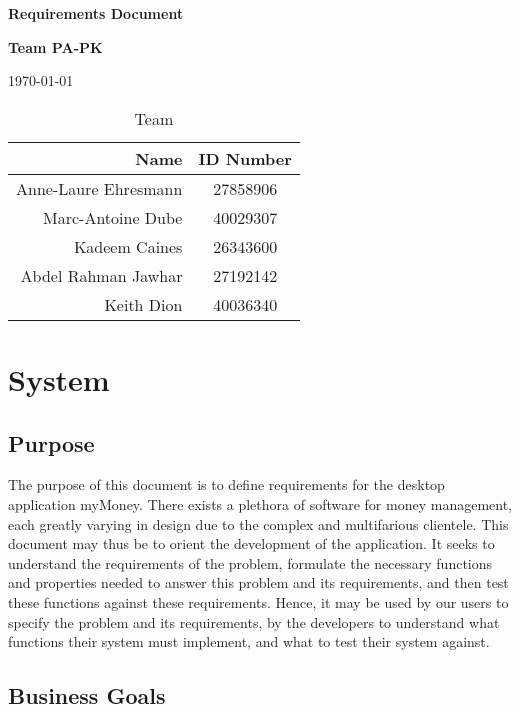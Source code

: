 \documentclass[11pt]{article}
\newcounter{use case ID}
\begin{document}
\vspace*{0.5in}
\centerline{\bf\Large Requirements Document}

\vspace*{0.5in}
\centerline{\bf\Large Team PA-PK}

\vspace*{0.5in}
\centerline{\today}

\vspace*{1.5in}
\begin{table}[htbp]
\caption{Team}
\begin{center}
\begin{tabular}{|r | c|}
\hline
Name & ID Number \\
\hline\hline
Anne-Laure Ehresmann & 27858906 \\
\hline
Marc-Antoine Dube & 40029307 \\
\hline
Kadeem Caines & 26343600 \\
\hline
Abdel Rahman Jawhar & 27192142 \\
\hline
Keith Dion & 40036340 \\
\hline
\end{tabular}
\end{center}
\end{table}

\tableofcontents
\listoffigures
\listoftables

\clearpage

\section{System}\subsection{Purpose}

The purpose of this document is to define requirements for the  desktop application myMoney.
There exists a plethora of software for money management, each greatly varying in design due to the complex and multifarious clientele. This document may thus be to orient the development of the application. It seeks to understand the requirements of the problem, formulate the necessary functions and properties needed to answer this problem and its requirements, and then test these functions against these requirements. Hence, it may be used by our users to specify the problem and its requirements, by the developers to understand what functions their system must implement, and what to test their system against.

\subsection{Business Goals}
\end{document}
